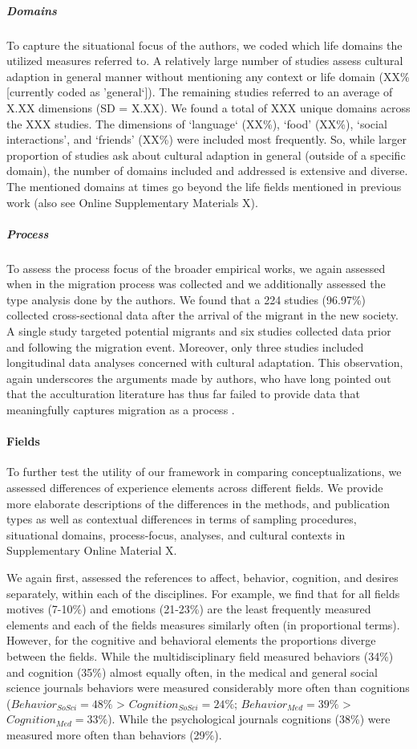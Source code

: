 \documentclass[man, 12pt, a4paper]{apa7}
\begin{document}
\subparagraph{Domains}
To capture the situational focus of the authors, we coded which life domains the utilized measures referred to. A relatively large number of studies assess cultural adaption in general manner without mentioning any context or life domain (XX\% [currently coded as 'general‘]). The remaining studies referred to an average of X.XX dimensions (SD = X.XX). We found a total of XXX unique domains across the XXX studies. The dimensions of `language‘ (XX\%), `food’ (XX\%), `social interactions’, and `friends’ (XX\%) were included most frequently. So, while larger proportion of studies ask about cultural adaption in general (outside of a specific domain), the number of domains included and addressed is extensive and diverse. The mentioned domains at times go beyond the life fields mentioned in previous work (also see Online Supplementary Materials X).
\vspace{1em}

\subparagraph{Process}
To assess the process focus of the broader empirical works, we again assessed when in the migration process was collected and we additionally assessed the type analysis done by the authors. We found that a 224 studies (96.97\%) collected cross-sectional data after the arrival of the migrant in the new society. A single study targeted potential migrants and six studies collected data prior and following the migration event. Moreover, only three studies included longitudinal data analyses concerned with cultural adaptation. This observation, again underscores the arguments made by authors, who have long pointed out that the acculturation literature has thus far failed to provide data that meaningfully captures migration as a process \citep[e.g.,][]{Brown2011, Ward2019}.

\paragraph{Fields}
To further test the utility of our framework in comparing conceptualizations, we assessed differences of experience elements across different fields. We provide more elaborate descriptions of the differences in the methods, and publication types as well as contextual differences in terms of sampling procedures, situational domains, process-focus, analyses, and cultural contexts in Supplementary Online Material X. 

We again first, assessed the references to affect, behavior, cognition, and desires separately, within each of the disciplines. For example, we find that for all fields motives (7-10\%) and emotions (21-23\%) are the least frequently measured elements and each of the fields measures similarly often (in proportional terms). However, for the cognitive and behavioral elements the proportions diverge between the fields. While the multidisciplinary field measured behaviors (34\%) and cognition (35\%) almost equally often, in the medical and general social science journals behaviors were measured considerably more often than cognitions ($Behavior_{SoSci} = 48\%$ > $Cognition_{SoSci} = 24\%$; $Behavior_{Med} = 39\%$ > $Cognition_{Med} = 33\%$). While the psychological journals cognitions (38\%) were measured more often than behaviors (29\%). 
\end{document}
